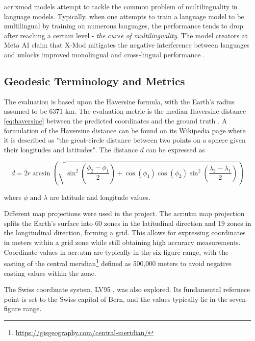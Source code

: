 \gls{acr:xmod} models \citep{pfeifferLiftingCurseMultilinguality2022} attempt to tackle the common problem of multilinguality in language models. Typically, when one attempts to train a language model to be multilingual by training on numerous languages, the performance tends to drop after reaching a certain level - \textit{the curse of multilinguality}. The model creators at Meta AI claim that X-Mod mitigates the negative interference between languages and unlocks improved monolingual and cross-lingual performance \citep[1]{pfeifferLiftingCurseMultilinguality2022}.

\subsection{Geodesic Terminology and Metrics}

The evaluation is based upon the Haversine formula, with the Earth's radius assumed to be 6371 km. The evaluation metric is the median Haversine distance \eqref{eq:haversine} between the predicted coordinates and the ground truth \citep[4]{scherrerHeLjuVarDial20202020}. A formulation of the Haversine distance can be found on its \href{https://en.wikipedia.org/wiki/Haversine_formula}{Wikipedia page} where it is described as "the great-circle distance between two points on a sphere given their longitudes and latitudes". The distance $d$ can be expressed as

\begin{equation}
    d = 2r \arcsin\left(\sqrt{\sin^2\left(\frac{\phi_2 - \phi_1}{2}\right) + \cos(\phi_1)\cos(\phi_2)\sin^2\left(\frac{\lambda_2 - \lambda_1}{2}\right)}\right)
    \label{eq:haversine}
\end{equation}

\noindent where $\phi$ and $\lambda$ are latitude and longitude values.

Different map projections were used in the project. The \gls{acr:utm} map projection splits the Earth's surface into 60 zones in the latitudinal direction and 19 zones in the longitudinal direction, forming a grid. This allows for expressing coordinates in meters within a grid zone while still obtaining high accuracy measurements. Coordinate values in \acrshort{acr:utm} are typically in the six-figure range, with the easting of the central meridian\footnote{\url{https://gisgeography.com/central-meridian/}} defined as 500,000 meters to avoid negative easting values within the zone.

The Swiss coordinate system, LV95 \citep{federalofficeoftopographyswisstopoSwissCoordinatesSystem}, was also explored. Its fundamental refernece point is set to the Swiss capital of Bern, and the values typically lie in the seven-figure range.



